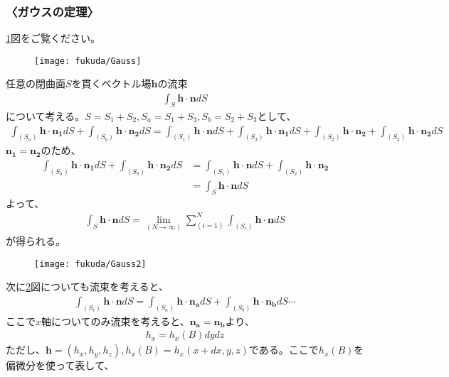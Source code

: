 \documentclass[10pt,b5paper,papersize,dvipdfmx]{jsbook}
\begin{document}
\subsubsection{〈ガウスの定理〉}
\ref{fig:Gauss1}図をご覧ください。
\begin{figure}[htbp]
  \begin{flushright}
  \texttt{[image: fukuda/Gauss]}
  \caption{}
  \label{fig:Gauss1}
  \end{flushright}
\end{figure}
任意の閉曲面$S$を貫くベクトル場$\mathbf{h}$の流束
\begin{align}
\int_S \mathbf{h}\cdot\mathbf{n}dS
\end{align}
について考える。$S=S_1 +S_2 ,S_a =S_1 +S_3 ,S_b =S_2 +S_3$として、
\begin{align}
\int_(S_a) \mathbf{h}\cdot\mathbf{n_1}dS+\int_(S_b) \mathbf{h}\cdot\mathbf{n_2}dS = \int_(S_1) \mathbf{h}\cdot\mathbf{n}dS + \int_(S_3) \mathbf{h}\cdot\mathbf{n_1}dS + \int_(S_2) \mathbf{h}\cdot\mathbf{n_2} + \int_(S_3) \mathbf{h}\cdot\mathbf{n_2}dS 
\end{align}
$\mathbf{n_1} = \mathbf{n_2}$のため、
\begin{align}
\int_(S_a) \mathbf{h}\cdot\mathbf{n_1}dS+\int_(S_b) \mathbf{h}\cdot\mathbf{n_2}dS 
&= \int_(S_1) \mathbf{h}\cdot\mathbf{n}dS + \int_(S_2) \mathbf{h}\cdot\mathbf{n_2}\\
&= \int_S \mathbf{h}\cdot\mathbf{n}dS
\end{align}
よって、
\begin{align}
\int_S \mathbf{h}\cdot\mathbf{n}dS = \lim_(N \to \infty)\sum_(i=1)^N \int_(S_i) \mathbf{h}\cdot\mathbf{n}dS
\end{align}
が得られる。
\begin{figure}[htbp]
  \begin{flushright}
  \texttt{[image: fukuda/Gauss2]}
  \caption{}
  \label{fig:Gauss2}
  \end{flushright}
\end{figure}
次に\ref{fig:Gauss2}図についても流束を考えると、
\begin{align}
\int_(S_i) \mathbf{h}\cdot\mathbf{n}dS = \int_(S_a) \mathbf{h}\cdot\mathbf{n_a}dS + \int_(S_b) \mathbf{h}\cdot\mathbf{n_b}dS\cdots
\end{align}
ここで$x$軸についてのみ流束を考えると、$\mathbf{n_a} = \mathbf{n_b}$より、
\begin{align}
h_x = h_x(B)dydz
\end{align}
ただし、$\mathbf{h} = (h_x,h_y,h_z),h_x(B)=h_x(x+dx,y,z)$である。ここで$h_x(B)$を偏微分を使って表して、
\end{document}
